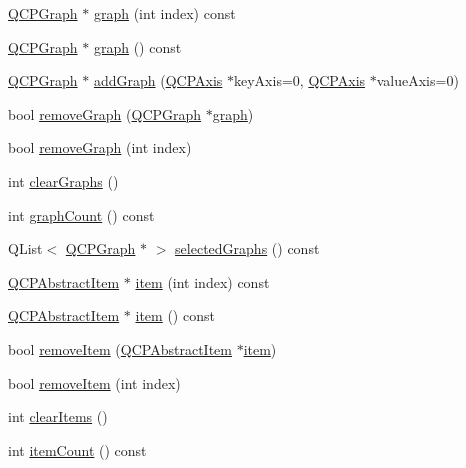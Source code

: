 \begin{DoxyCompactItemize}
\item 
\hyperlink{classQCPGraph}{Q\+C\+P\+Graph} $\ast$ \hyperlink{classQCustomPlot_a6ecae130f684b25276fb47bd3a5875c6}{graph} (int index) const
\item 
\hyperlink{classQCPGraph}{Q\+C\+P\+Graph} $\ast$ \hyperlink{classQCustomPlot_aac190865a67f19af3fdf2136774997af}{graph} () const
\item 
\hyperlink{classQCPGraph}{Q\+C\+P\+Graph} $\ast$ \hyperlink{classQCustomPlot_a6fb2873d35a8a8089842d81a70a54167}{add\+Graph} (\hyperlink{classQCPAxis}{Q\+C\+P\+Axis} $\ast$key\+Axis=0, \hyperlink{classQCPAxis}{Q\+C\+P\+Axis} $\ast$value\+Axis=0)
\item 
bool \hyperlink{classQCustomPlot_a903561be895fb6528a770d66ac5e6713}{remove\+Graph} (\hyperlink{classQCPGraph}{Q\+C\+P\+Graph} $\ast$\hyperlink{classQCustomPlot_a6ecae130f684b25276fb47bd3a5875c6}{graph})
\item 
bool \hyperlink{classQCustomPlot_a9554b3d2d5b10c0f884bd4010b6c192c}{remove\+Graph} (int index)
\item 
int \hyperlink{classQCustomPlot_ab0f3abff2d2f7df3668b5836f39207fa}{clear\+Graphs} ()
\item 
int \hyperlink{classQCustomPlot_a5e1787cdde868c4d3790f9ebc8207d90}{graph\+Count} () const
\item 
Q\+List$<$ \hyperlink{classQCPGraph}{Q\+C\+P\+Graph} $\ast$ $>$ \hyperlink{classQCustomPlot_ad3547aded026d8a9ae6ef13a69080d06}{selected\+Graphs} () const
\item 
\hyperlink{classQCPAbstractItem}{Q\+C\+P\+Abstract\+Item} $\ast$ \hyperlink{classQCustomPlot_ac042f2e78edd228ccf2f26b7fe215239}{item} (int index) const
\item 
\hyperlink{classQCPAbstractItem}{Q\+C\+P\+Abstract\+Item} $\ast$ \hyperlink{classQCustomPlot_a12eb2a283cf10a8a9176c01c0443e83e}{item} () const
\item 
bool \hyperlink{classQCustomPlot_ae04446557292551e8fb6e2c106e1848d}{remove\+Item} (\hyperlink{classQCPAbstractItem}{Q\+C\+P\+Abstract\+Item} $\ast$\hyperlink{classQCustomPlot_ac042f2e78edd228ccf2f26b7fe215239}{item})
\item 
bool \hyperlink{classQCustomPlot_abcfdda3d601c0441cab136137d715dea}{remove\+Item} (int index)
\item 
int \hyperlink{classQCustomPlot_abdfd07d4f0591d0cf967f85013fd3645}{clear\+Items} ()
\item 
int \hyperlink{classQCustomPlot_a16025daf0341f9362be3080e404424c2}{item\+Count} () const
\item 

\end{DoxyCompactItemize}

